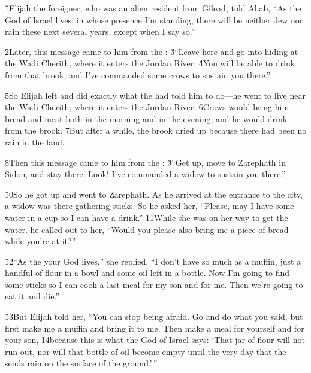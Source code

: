 \v{1}Elijah the foreigner, who was an alien resident from Gilead, told Ahab, ``As the  God of Israel lives, in whose presence I'm standing, there will be neither dew nor rain these next several years, except when I say so.''

\v{2}Later, this message came to him from the : \v{3}``Leave here and go into hiding at the Wadi Cherith, where it enters the Jordan River. \v{4}You will be able to drink from that brook, and I've commanded some crows to sustain you there.''

\v{5}So Elijah left and did exactly what the  had told him to do---he went to live near the Wadi Cherith, where it enters the Jordan River. \v{6}Crows would bring him bread and meat both in the morning and in the evening, and he would drink from the brook. \v{7}But after a while, the brook dried up because there had been no rain in the land.

\v{8}Then this message came to him from the : \v{9}``Get up, move to Zarephath in Sidon, and stay there. Look! I've commanded a widow to sustain you there.''

\v{10}So he got up and went to Zarephath. As he arrived at the entrance to the city, a widow was there gathering sticks. So he asked her, ``Please, may I have some water in a cup so I can have a drink.'' \v{11}While she was on her way to get the water, he called out to her, ``Would you please also bring me a piece of bread while you're at it?''

\v{12}``As the  your God lives,'' she replied, ``I don't have so much as a muffin, just a handful of flour in a bowl and some oil left in a bottle. Now I'm going to find some sticks so I can cook a last meal for my son and for me. Then we're going to eat it and die.''

\v{13}But Elijah told her, ``You can stop being afraid. Go and do what you said, but first make me a muffin and bring it to me. Then make a meal for yourself and for your son, \v{14}because this is what the  God of Israel says: `That jar of flour will not run out, nor will that bottle of oil become empty until the very day that the  sends rain on the surface of the ground.'\,''

